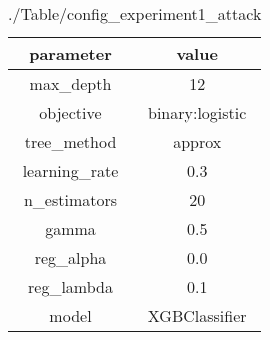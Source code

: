 \begin{table}[h]
\centering
\begin{tabular}{| c|c|}
\hline
parameter & value\\
\hline
max_depth & 12 \\\hline
objective & binary:logistic \\\hline
tree_method & approx \\\hline
learning_rate & 0.3 \\\hline
n_estimators & 20 \\\hline
gamma & 0.5 \\\hline
reg_alpha & 0.0 \\\hline
reg_lambda & 0.1 \\\hline
model & XGBClassifier \\\hline

\end{tabular}\caption{./Table/config_experiment1_attack}
\label{tab:./Table/config_experiment1_attack}
\end{table}
